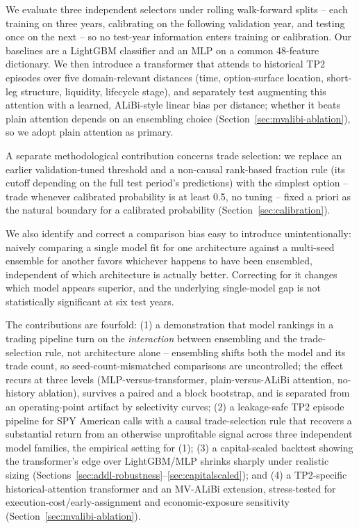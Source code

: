 \documentclass[sigconf,review]{acmart}
\begin{document}
We evaluate three independent selectors under rolling walk-forward splits -- each training on three years, calibrating on the following validation year, and testing once on the next -- so no test-year information enters training or calibration. Our baselines are a LightGBM classifier and an MLP on a common 48-feature dictionary. We then introduce a transformer that attends to historical TP2 episodes over five domain-relevant distances (time, option-surface location, short-leg structure, liquidity, lifecycle stage), and separately test augmenting this attention with a learned, ALiBi-style linear bias per distance; whether it beats plain attention depends on an ensembling choice (Section~\ref{sec:mvalibi-ablation}), so we adopt plain attention as primary.

A separate methodological contribution concerns trade selection: we replace an earlier validation-tuned threshold and a non-causal rank-based fraction rule (its cutoff depending on the full test period's predictions) with the simplest option -- trade whenever calibrated probability is at least 0.5, no tuning -- fixed a priori as the natural boundary for a calibrated probability (Section~\ref{sec:calibration}).

We also identify and correct a comparison bias easy to introduce unintentionally: naively comparing a single model fit for one architecture against a multi-seed ensemble for another favors whichever happens to have been ensembled, independent of which architecture is actually better. Correcting for it changes which model appears superior, and the underlying single-model gap is not statistically significant at six test years.

The contributions are fourfold: (1) a demonstration that model rankings in a trading pipeline turn on the \emph{interaction} between ensembling and the trade-selection rule, not architecture alone -- ensembling shifts both the model and its trade count, so seed-count-mismatched comparisons are uncontrolled; the effect recurs at three levels (MLP-versus-transformer, plain-versus-ALiBi attention, no-history ablation), survives a paired and a block bootstrap, and is separated from an operating-point artifact by selectivity curves; (2) a leakage-safe TP2 episode pipeline for SPY American calls with a causal trade-selection rule that recovers a substantial return from an otherwise unprofitable signal across three independent model families, the empirical setting for (1); (3) a capital-scaled backtest showing the transformer's edge over LightGBM/MLP shrinks sharply under realistic sizing (Sections~\ref{sec:addl-robustness}--\ref{sec:capitalscaled}); and (4) a TP2-specific historical-attention transformer and an MV-ALiBi extension, stress-tested for execution-cost/early-assignment and economic-exposure sensitivity (Section~\ref{sec:mvalibi-ablation}).
\end{document}
